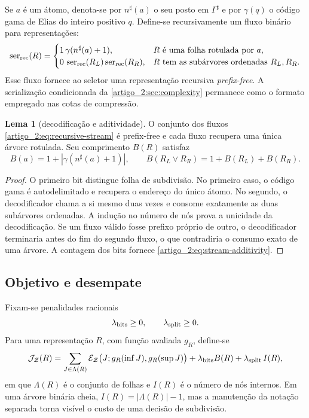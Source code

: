 \documentclass[12pt,a4paper]{article}
\theoremstyle{preciso}
\theoremstyle{definition}
\newcommand{\ser}{\operatorname{ser}}
\newcommand{\cost}{\mathcal{J}}
\newcommand{\loss}{\mathcal{E}}
\theoremstyle{preciso}
\theoremstyle{preciso}
\newtheorem{lemma}[teorema]{Lema}
\theoremstyle{preciso}
\theoremstyle{preciso}
\theoremstyle{definition}
\theoremstyle{preciso}
\theoremstyle{definition}
\theoremstyle{preciso}
\theoremstyle{preciso}
\theoremstyle{definition}
\begin{document}
Se $a$ é um átomo, denota-se por $n^\sharp(a)$ o seu posto em $\Gamma^\sharp$ e
por $\gamma(q)$ o código gama de Elias do inteiro positivo $q$. Define-se
recursivamente um fluxo binário para representações:
\begin{equation}
 \ser_{\rm rec}(R)=
 \begin{cases}
 1\,\gamma(n^\sharp(a)+1),&R\text{ é uma folha rotulada por }a,\\
 0\,\ser_{\rm rec}(R_L)\ser_{\rm rec}(R_R),
 &R\text{ tem as subárvores ordenadas }R_L,R_R.
 \end{cases}
 \label{artigo_2:eq:recursive-stream}
\end{equation}
Esse fluxo fornece ao seletor uma representação recursiva \emph{prefix-free}. A
serialização condicionada da \cref{artigo_2:sec:complexity} permanece como o formato
empregado nas cotas de compressão.

\begin{lemma}[decodificação e aditividade]\label{map:artigo_2:5.1}
\label{artigo_2:lem:recursive-stream}
O conjunto dos fluxos \eqref{artigo_2:eq:recursive-stream} é prefix-free e cada fluxo
recupera uma única árvore rotulada. Seu comprimento $B(R)$ satisfaz
\begin{equation}
 B(a)=1+|\gamma(n^\sharp(a)+1)|,\qquad
 B(R_L\vee R_R)=1+B(R_L)+B(R_R).
 \label{artigo_2:eq:stream-additivity}
\end{equation}
\end{lemma}

\begin{proof}
O primeiro bit distingue folha de subdivisão. No primeiro caso, o código gama
é autodelimitado e recupera o endereço do único átomo. No segundo, o
decodificador chama a si mesmo duas vezes e consome exatamente as duas
subárvores ordenadas. A indução no número de nós prova a unicidade da
decodificação. Se um fluxo válido fosse prefixo próprio de outro, o
decodificador terminaria antes do fim do segundo fluxo, o que contradiria o
consumo exato de uma árvore. A contagem dos bits fornece
\eqref{artigo_2:eq:stream-additivity}.
\end{proof}

\subsection{Objetivo e desempate}

Fixam-se penalidades racionais
\[
 \lambda_{\rm bits}\ge0,\qquad \lambda_{\rm split}\ge0.
\]
Para uma representação $R$, com função avaliada $g_R$, define-se
\begin{equation}
 \cost_{\mathcal Z}(R)
 =\sum_{J\in\Lambda(R)}
   \loss_{\mathcal Z}\bigl(J;g_R(\inf J),g_R(\sup J)\bigr)
 +\lambda_{\rm bits}B(R)
 +\lambda_{\rm split}\,I(R),
 \label{artigo_2:eq:additive-objective}
\end{equation}
em que $\Lambda(R)$ é o conjunto de folhas e $I(R)$ é o número de nós internos.
Em uma árvore binária cheia, $I(R)=|\Lambda(R)|-1$, mas a manutenção da notação
separada torna visível o custo de uma decisão de subdivisão.
\end{document}
